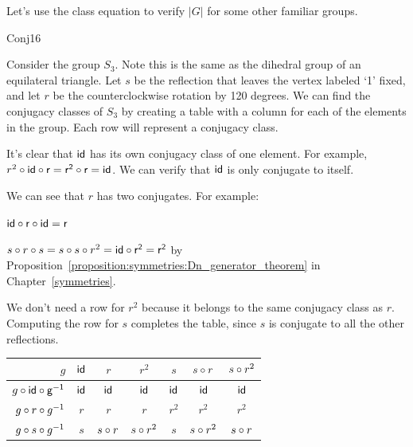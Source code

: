 Let's use the class equation to verify $|G|$ for some other familiar groups.  

\begin{example}{Conj16}

Consider the group $S_3$.  Note this is the same as the dihedral group of an equilateral triangle.  
Let $s$ be the reflection that leaves the vertex labeled `1' fixed, and let $r$ be the counterclockwise rotation by 120 degrees.  We can find the conjugacy classes of $S_3$ by creating a table with a column for each of the elements in the group.  Each row will represent a conjugacy class.  

It's clear that $\sf{id}$ has its own conjugacy class of one element.  For example, 
$r^2\circ \sf{id} \circ r=r^2\circ r=\sf{id}$. We can verify that $\sf{id}$ is only conjugate to itself.

 We can see that $r$ has two conjugates.  For example:

 $\sf{id}\circ r \circ \sf{id}=r$ 

$s\circ r \circ s=s\circ s\circ r^2=\sf{id}\circ r^2=r^2$
by Proposition~\ref{proposition:symmetries:Dn_generator_theorem}  in Chapter~\ref{symmetries}.  

%


We don't need a row for $r^2$ because it belongs to the same conjugacy class as $r$.  
Computing the row for $s$ completes the table, since $s$ is conjugate to all the other reflections.

\begin{center}
\begin{tabular}{|r | c | c |c | c | c |c |}\hline
$g$ &$\sf{id}$ & $r$ &$r^2$ &$ s$ &$ s\circ r$ & $s\circ r ^2$\\ \hline
$g\circ \sf{id}\circ g^{-1}$ & $\sf{id}$ & $\sf{id}$ & $\sf{id}$ &$\sf{id}$ &$\sf{id}$ &$\sf{id}$ \\ \hline
$ g\circ r\circ g^{-1}$& $r$&$ r$& $r$&$r^2$ &$r^2$ & $r^2$\\ \hline
$g\circ s\circ g^{-1}$ & $s$ &$ s\circ r$ & $s\circ r^2$ & $s$ & $s\circ r^2$ & $s\circ r$\\ \hline 
\end{tabular}
\end{center}


\end{example}
